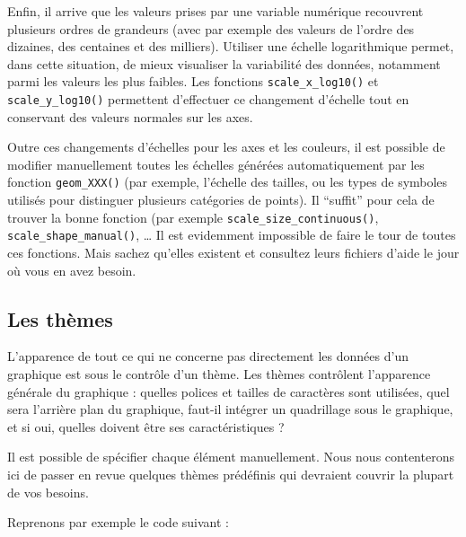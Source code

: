 \documentclass[
  letterpaper,
  DIV=11,
  numbers=noendperiod]{scrreprt}
\begin{document}
Enfin, il arrive que les valeurs prises par une variable numérique
recouvrent plusieurs ordres de grandeurs (avec par exemple des valeurs
de l'ordre des dizaines, des centaines et des milliers). Utiliser une
échelle logarithmique permet, dans cette situation, de mieux visualiser
la variabilité des données, notamment parmi les valeurs les plus
faibles. Les fonctions \texttt{scale\_x\_log10()} et
\texttt{scale\_y\_log10()} permettent d'effectuer ce changement
d'échelle tout en conservant des valeurs normales sur les axes.

Outre ces changements d'échelles pour les axes et les couleurs, il est
possible de modifier manuellement toutes les échelles générées
automatiquement par les fonction \texttt{geom\_XXX()} (par exemple,
l'échelle des tailles, ou les types de symboles utilisés pour distinguer
plusieurs catégories de points). Il ``suffit'' pour cela de trouver la
bonne fonction (par exemple \texttt{scale\_size\_continuous()},
\texttt{scale\_shape\_manual()}, \ldots{} Il est evidemment impossible
de faire le tour de toutes ces fonctions. Mais sachez qu'elles existent
et consultez leurs fichiers d'aide le jour où vous en avez besoin.

\hypertarget{les-thuxe8mes}{%
\subsection{Les thèmes}\label{les-thuxe8mes}}

L'apparence de tout ce qui ne concerne pas directement les données d'un
graphique est sous le contrôle d'un thème. Les thèmes contrôlent
l'apparence générale du graphique : quelles polices et tailles de
caractères sont utilisées, quel sera l'arrière plan du graphique,
faut-il intégrer un quadrillage sous le graphique, et si oui, quelles
doivent être ses caractéristiques ?

Il est possible de spécifier chaque élément manuellement. Nous nous
contenterons ici de passer en revue quelques thèmes prédéfinis qui
devraient couvrir la plupart de vos besoins.

Reprenons par exemple le code suivant :
\end{document}
